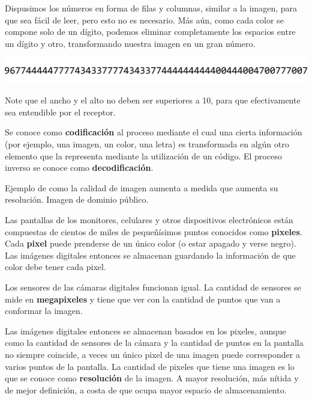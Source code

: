 Dispusimos los números en forma de filas y columnas, similar a la imagen, para
que sea fácil de leer, pero esto no es necesario. Más aún, como cada color se
compone solo de un dígito, podemos eliminar completamente los espacios entre un
dígito y otro, transformando nuestra imagen en un gran número.

\centerline{\includegraphics[]{unidades/2_informacion/1_bajo_nivel/imagenes/pixels_car_numbers_final.png}}

Note que el ancho y el alto no deben ser superiores a 10, para que efectivamente
sea entendible por el receptor.

\begin{definition} Se conoce como
    \textbf{codificación} al proceso mediante el cual una cierta información
    (por ejemplo, una imagen, un color, una letra) es transformada en algún otro
    elemento que la representa mediante la utilización de un código. El proceso
    inverso se conoce como \textbf{decodificación}.
\end{definition}

{Ejemplo de como la calidad de imagen aumenta a medida que aumenta su
resolución.} {Imagen de dominio público.}

\begin{knowwhat}
Las pantallas de los monitores, celulares y otros dispositivos electrónicos
están compuestas de cientos de miles de pequeñísimos puntos conocidos como
\textbf{pixeles}. Cada \textbf{pixel} puede prenderse de un único color (o estar
apagado y verse negro). Las imágenes digitales entonces se almacenan guardando
la información de que color debe tener cada pixel.

Los sensores de las cámaras digitales funcionan igual. La cantidad de sensores
se mide en \textbf{megapixeles} y tiene que ver con la cantidad de puntos que
van a conformar la imagen.

Las imágenes digitales entonces se almacenan basados en los pixeles, aunque como
la cantidad de sensores de la cámara y la cantidad de puntos en la pantalla no
siempre coincide, a veces un único pixel de una imagen puede corresponder a
varios puntos de la pantalla. La cantidad de pixeles que tiene una imagen es lo
que se conoce como \textbf{resolución} de la imagen. A mayor resolución, más
nítida y de mejor definición, a costa de que ocupa mayor espacio de
almacenamiento.
\end{knowwhat}

